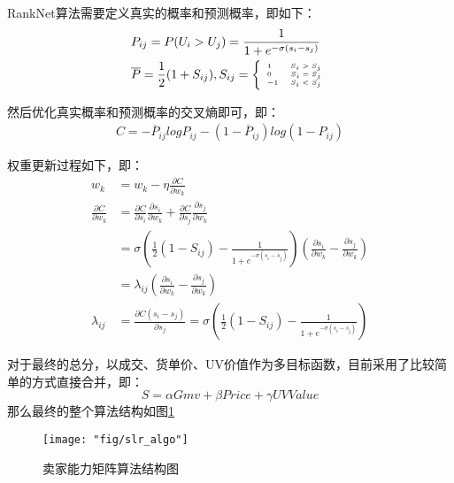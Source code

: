 RankNet算法需要定义真实的概率和预测概率，即如下：
\begin{equation}
\begin{aligned}
& P_{ij}  =P(U_{i}>U_{j})=\frac{1}{1+e^{-\sigma(s_{i}-s_{j})}} \\
& \overline{P}  =\frac{1}{2}(1+S_{ij}) , 
\begin{tiny}
	S_{ij}=\left\{
		\begin{array}{lr}
			1 & S_{i}>S_{j} \\
			0 & S_{i}=S_{j} \\
			-1 & S_{i}<S_{j}
		\end{array}
	\right.
\end{tiny}
\end{aligned}
\end{equation}


然后优化真实概率和预测概率的交叉熵即可，即：
\begin{equation}
\begin{aligned}
	C = -\overline{P}_{ij}logP_{ij}-(1-\overline{P}_{ij})log(1-P_{ij})
\end{aligned}
\end{equation}

权重更新过程如下，即：
\begin{equation}
\begin{aligned}
	w_{k}&=w_{k}-\eta \frac{\partial C}{\partial w_{k}} \\
	\frac{\partial C}{\partial w_{k}}&=\frac{\partial C}{\partial s_{i}} \frac{\partial s_{i}}{\partial w_{k}}+\frac{\partial C}{\partial s_{j}} \frac{\partial s_{j}}{\partial w_{k}} \\
	&=\sigma(\frac{1}{2}(1-S_{ij})-\frac{1}{1+e^{-\sigma(s_{i}-s_{j})}})(\frac{\partial s_{i}}{\partial w_{k}}-\frac{\partial s_{j}}{\partial w_{k}}) \\
	&=\lambda_{ij}(\frac{\partial s_{i}}{\partial w_{k}}-\frac{\partial s_{j}}{\partial w_{k}}) \\
	\lambda_{ij}&=\frac{\partial C(s_{i}-s_{j})}{\partial s_{j}}=\sigma(\frac{1}{2}(1-S_{ij})-\frac{1}{1+e^{-\sigma(s_{i}-s_{j})}})
\end{aligned}
\end{equation}

对于最终的总分，以成交、货单价、UV价值作为多目标函数，目前采用了比较简单的方式直接合并，即：
\begin{equation}
S=\alpha Gmv+\beta Price+\gamma UVValue
\end{equation}
那么最终的整个算法结构如图\ref{fig:slr_algo}
\begin{figure}
	\centering
	\texttt{[image: "fig/slr\_algo"]}
	\caption{卖家能力矩阵算法结构图}
	\label{fig:slr_algo}
\end{figure}

